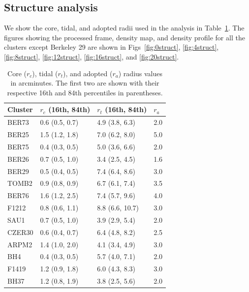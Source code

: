 \documentclass{aa}
\begin{document}
\begin{appendix}

\FloatBarrier
\section{Structure analysis}
 \label{app:struct_analysis}

 We show the core, tidal, and adopted radii used in the analysis in
 Table~\ref{tab:radii}. The figures showing the processed frame, density map,
 and density profile for all the clusters except Berkeley 29 are shown in
 Figs~\ref{fig:0struct}, \ref{fig:4struct}, \ref{fig:8struct}, 
 \ref{fig:12struct}, \ref{fig:16struct}, and \ref{fig:20struct}.

 \begin{table}[h!]
 \caption{Core ($r_{c}$), tidal ($r_{t}$), and adopted ($r_{a}$) radius values
 in arcminutes. The first two are shown with their respective 16th and 84th
 percentiles in parentheses.}
 \label{tab:radii}
 \centering
 \begin{tabular}{llll}
 \hline\hline
 Cluster & $r_{c}$ (16th, 84th) &  $r_{t}$ (16th, 84th) & $r_{a}$\\
 \hline
  BER73         & 0.6 (0.5, 0.7) &  4.9 (3.8, 6.3) &  2.0\\
  BER25         & 1.5 (1.2, 1.8) &  7.0 (6.2, 8.0) &  5.0\\
  BER75         & 0.4 (0.3, 0.5) &  5.0 (3.6, 6.6) &  2.0\\
  BER26         & 0.7 (0.5, 1.0) &  3.4 (2.5, 4.5) &  1.6\\
  BER29         & 0.5 (0.4, 0.5) &  7.4 (6.4, 8.6) &  3.0\\
  TOMB2         & 0.9 (0.8, 0.9) &  6.7 (6.1, 7.4) &  3.5\\
  BER76         & 1.6 (1.2, 2.5) &  7.4 (5.7, 9.6) &  4.0\\
  F1212         & 0.8 (0.6, 1.1) &  8.8 (6.6, 10.7) & 3.0\\
  SAU1          & 0.7 (0.5, 1.0) &  3.9 (2.9, 5.4) &  2.0\\
  CZER30        & 0.6 (0.4, 0.7) &  6.4 (4.8, 8.2) &  2.5\\
  ARPM2         & 1.4 (1.0, 2.0) &  4.1 (3.4, 4.9) &  3.0\\
  BH4           & 0.4 (0.3, 0.5) &  5.7 (4.0, 7.1) &  2.0\\
  F1419         & 1.2 (0.9, 1.8) &  6.0 (4.3, 8.3) &  3.0\\
  BH37          & 1.2 (0.8, 1.9) &  3.8 (2.5, 5.6) &  2.0\\

\end{tabular}
\end{table}
\end{appendix}
\end{document}
